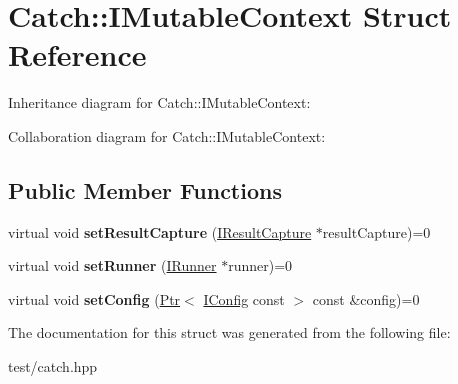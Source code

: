 \hypertarget{structCatch_1_1IMutableContext}{}\section{Catch\+:\+:I\+Mutable\+Context Struct Reference}
\label{structCatch_1_1IMutableContext}


Inheritance diagram for Catch\+:\+:I\+Mutable\+Context\+:


Collaboration diagram for Catch\+:\+:I\+Mutable\+Context\+:
\subsection*{Public Member Functions}
\begin{DoxyCompactItemize}
\item 
virtual void {\bfseries set\+Result\+Capture} (\hyperlink{structCatch_1_1IResultCapture}{I\+Result\+Capture} $\ast$result\+Capture)=0\hypertarget{structCatch_1_1IMutableContext_a4a80afd0525b7def21bee8d9b48f2d39}{}\label{structCatch_1_1IMutableContext_a4a80afd0525b7def21bee8d9b48f2d39}

\item 
virtual void {\bfseries set\+Runner} (\hyperlink{structCatch_1_1IRunner}{I\+Runner} $\ast$runner)=0\hypertarget{structCatch_1_1IMutableContext_af2e53b1dea4527a2587cff266a730f6e}{}\label{structCatch_1_1IMutableContext_af2e53b1dea4527a2587cff266a730f6e}

\item 
virtual void {\bfseries set\+Config} (\hyperlink{classCatch_1_1Ptr}{Ptr}$<$ \hyperlink{structCatch_1_1IConfig}{I\+Config} const  $>$ const \&config)=0\hypertarget{structCatch_1_1IMutableContext_a04ae4f4219a481a7bf658d9fd445bc1d}{}\label{structCatch_1_1IMutableContext_a04ae4f4219a481a7bf658d9fd445bc1d}

\end{DoxyCompactItemize}


The documentation for this struct was generated from the following file\+:\begin{DoxyCompactItemize}
\item 
test/catch.\+hpp\end{DoxyCompactItemize}
